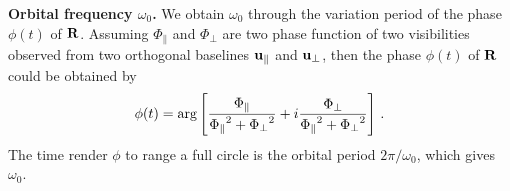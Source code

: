 \documentclass[twocolumn]{aastex62}
\def\m{\begin{eqnarray}}
\def\n{\end{eqnarray}}
\begin{document}
{\bf{Orbital frequency $\omega_0$.}} We obtain $\omega_0$ through the variation period of the phase $\phi(t)$ of ${\bf R}$. Assuming $\Phi_{\parallel}$ and $\Phi_{\perp}$ are two phase function of two visibilities observed from two orthogonal baselines ${\bf u}_{\parallel}$ and ${\bf u}_{\perp}$, then the phase $\phi(t)$ of ${\bf R}$ could be obtained by 
\m
\phi(t)={\rm arg}\left[ {\Phi_{\parallel} \over {\Phi_{\parallel}}^2 +{\Phi_{\perp}}^2}  + i {\Phi_{\perp} \over {\Phi_{\parallel}}^2 +{\Phi_{\perp}}^2}  \right]\,.
\n
The time render $\phi$ to range a full circle is the orbital period $2\pi/\omega_0$, which gives $\omega_0$. 
%

\end{document}
